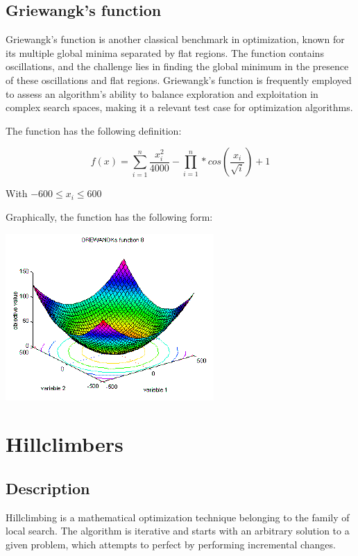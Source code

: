 \documentclass[conference]{IEEEtran}
\begin{document}
\subsection{Griewangk's function}
Griewangk's function is another classical benchmark in optimization, known for its multiple global minima separated by flat regions.
The function contains oscillations, and the challenge lies in finding the global minimum in the presence of these oscillations
and flat regions. Griewangk's function is frequently employed to assess an algorithm's ability to balance exploration
and exploitation in complex search spaces, making it a relevant test case for optimization algorithms.

The function has the following definition:

\begin{equation}
    f(x) = \sum_{i=1}^{n} \frac{x_i^2}{4000} - \prod_{i=1}^{n} * cos(\frac{x_i}{\sqrt{i}}) + 1
\end{equation}

With $-600 \leq x_i \leq 600$

Graphically, the function has the following form:

\includegraphics[scale=0.75]{../images/fcnindex-msh_f8_500-19.gif}


\section{Hillclimbers}

\subsection{Description}
Hillclimbing is a mathematical optimization technique belonging to the family of local search. The algorithm is iterative
and starts with an arbitrary solution to a given problem, which attempts to perfect by performing incremental changes.
\end{document}
